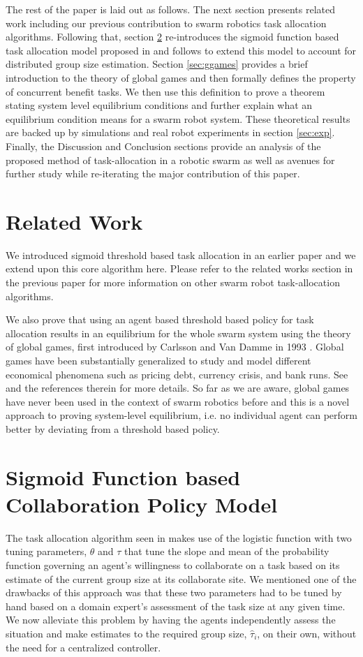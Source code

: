 \documentclass[conference]{ieeeconf}
\def\estt{\hat{\tau}}
\begin{document}
The rest of the paper is laid out as follows. The next section presents related work including our previous contribution to swarm robotics task allocation algorithms. Following that, section \ref{sec:model} re-introduces the sigmoid function based task allocation model proposed in \cite{Kanakia2014} and follows to extend this model to account for distributed group size estimation. Section \ref{sec:ggames} provides a brief introduction to the theory of global games and then formally defines the property of concurrent benefit tasks. We then use this definition to prove a theorem stating system level equilibrium conditions and further explain what an equilibrium condition means for a swarm robot system. These theoretical results are backed up by simulations and real robot experiments in section \ref{sec:exp}. Finally, the Discussion and Conclusion sections provide an analysis of the proposed method of task-allocation in a robotic swarm as well as avenues for further study while re-iterating the major contribution of this paper.

\section{Related Work}\label{subsec:rw}
We introduced sigmoid threshold based task allocation in an earlier paper \cite{Kanakia2014} and we extend upon this core algorithm here. Please refer to the related works section in the previous paper for more information on other swarm robot task-allocation algorithms.

We also prove that using an agent based threshold based policy for task allocation results in an equilibrium for the whole swarm system using the theory of global games, first introduced by Carlsson and Van Damme in 1993 \cite{Carlsson1993}. Global games have been substantially generalized to study and model different economical phenomena such as pricing debt, currency crisis, and bank runs. See \cite{Morris2000} and the references therein for more details. So far as we are aware, global games have never been used in the context of swarm robotics before and this is a novel approach to proving system-level equilibrium, i.e. no individual agent can perform better by deviating from a threshold based policy.

\section{Sigmoid Function based Collaboration Policy Model}\label{sec:model}
The task allocation algorithm seen in \cite{Kanakia2014} makes use of the logistic function with two tuning parameters, $\theta$ and $\tau$ that tune the slope and mean of the probability function governing an agent's willingness to collaborate on a task based on its estimate of the current group size at its collaborate site. We mentioned one of the drawbacks of this approach was that these two parameters had to be tuned by hand based on a domain expert's assessment of the task size at any given time. We now alleviate this problem by having the agents independently assess the situation and make estimates to the required group size, $\estt_i$, on their own, without the need for a centralized controller.
\end{document}
